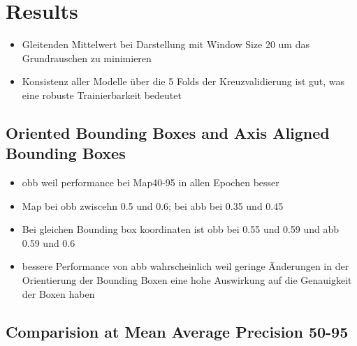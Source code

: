 \chapter{Results}
\label{ch:results}

\begin{itemize}
    \item Gleitenden Mittelwert bei Darstellung mit Window Size 20 um das Grundrauschen zu minimieren
    \item Konsistenz aller Modelle über die 5 Folds der Kreuzvalidierung ist gut, was eine robuste Trainierbarkeit bedeutet
\end{itemize}
\section{Oriented Bounding Boxes and Axis Aligned Bounding Boxes}
\begin{itemize}
    \item obb weil performance bei Map40-95 in allen Epochen besser
    \item Map bei obb zwiscehn 0.5 und 0.6; bei abb bei 0.35 und 0.45
    \item Bei gleichen Bounding box koordinaten ist obb bei 0.55 und 0.59 und abb 0.59 und 0.6
    \item bessere Performance von abb wahrscheinlich weil geringe Änderungen in der Orientierung der Bounding Boxen eine hohe Auswirkung auf die Genauigkeit der Boxen haben
\end{itemize}

\section{Comparision at Mean Average Precision 50-95}

